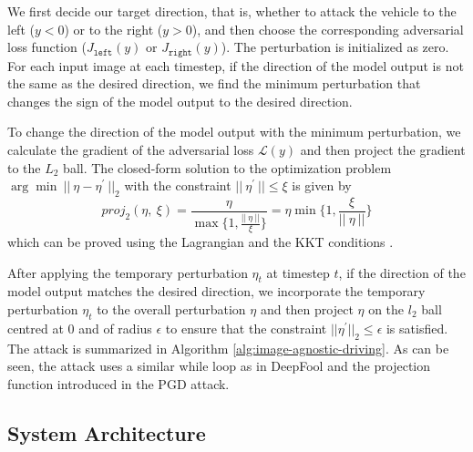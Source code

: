 We first decide our target direction, that is, whether to attack the vehicle to the left ($y < 0$) or to the right ($y > 0$), and then choose the corresponding adversarial loss function ($J_{\texttt{left}}(y)$ or $J_{\texttt{right}}(y)$). The perturbation is initialized as zero. For each input image at each timestep, if the direction of the model output is not the same as the desired direction, we find the minimum perturbation that changes the sign of the model output to the desired direction. 

To change the direction of the model output with the minimum perturbation, we calculate the gradient of the adversarial loss $\mathcal{L}(y)$ and then project the gradient to the $L_2$ ball. The closed-form solution to the optimization problem $\arg \min \ ||\ \eta - \eta^{'} \ ||_{2}$ with the constraint $||\ \eta^{'} \ || \leq \xi$ is given by
\begin{equation}
    proj_{2}(\eta,\  \xi) = \frac{\eta}{\max\{1, \frac{||\ \eta\ ||}{\xi}\}} =  \eta \min\{1, \frac{\xi}{||\ \eta\ ||} \}
\end{equation}
which can be proved using the Lagrangian and the KKT conditions \citep{boyd2004convex}.



After applying the temporary perturbation $\eta_{t}$ at timestep $t$, if the direction of the model output matches the desired direction, we incorporate the temporary perturbation $\eta_{t}$ to the overall perturbation $\eta$ and then project $\eta$ on the $l_2$ ball centred at 0 and of radius $\epsilon$ to ensure that the constraint $||{\eta}^{'}||_{2} \leq \epsilon$ is satisfied. The attack is summarized in Algorithm \ref{alg:image-agnostic-driving}. As can be seen, the attack uses a similar while loop as in DeepFool and the projection function introduced in the PGD attack.


\subsection{System Architecture}


